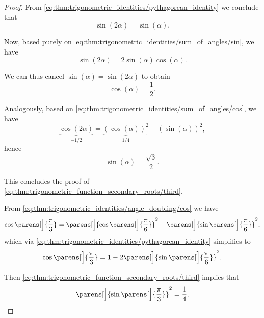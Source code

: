 \begin{proof}
  From \eqref{eq:thm:trigonometric_identities/pythagorean_identity} we conclude that
  \begin{equation}\label{eq:thm:trigonometric_function_secondary_roots/third/proof/cos_double}
    \sin(2\alpha) = \sin(\alpha).
  \end{equation}

  Now, based purely on \eqref{eq:thm:trigonometric_identities/sum_of_angles/sin}, we have
  \begin{equation*}
    \sin(2\alpha) = 2 \sin(\alpha) \cos(\alpha).
  \end{equation*}

  We can thus cancel \( \sin(\alpha) = \sin(2\alpha) \) to obtain
  \begin{equation*}
    \cos(\alpha) = \frac 1 2.
  \end{equation*}

  Analogously, based on \eqref{eq:thm:trigonometric_identities/sum_of_angles/cos}, we have
  \begin{equation*}
    \underbrace{\cos(2\alpha)}_{-1/2} = \underbrace{(\cos(\alpha))^2}_{1/4} - (\sin(\alpha))^2,
  \end{equation*}
  hence
  \begin{equation*}
    \sin(\alpha) = \frac {\sqrt 3} 2.
  \end{equation*}

  This concludes the proof of \eqref{eq:thm:trigonometric_function_secondary_roots/third}.

   From \eqref{eq:thm:trigonometric_identities/angle_doubling/cos} we have
  \begin{equation*}
    \cos\parens[\Big]{ \frac \pi 3 } = \parens[\Big]{ \cos\parens[\Big]{ \frac \pi 6 } }^2 - \parens[\Big]{ \sin\parens[\Big]{ \frac \pi 6 } }^2,
  \end{equation*}
  which via \eqref{eq:thm:trigonometric_identities/pythagorean_identity} simplifies to
  \begin{equation*}
    \cos\parens[\Big]{ \frac \pi 3 } = 1 - 2 \parens[\Big]{ \sin\parens[\Big]{ \frac \pi 6 } }^2.
  \end{equation*}

  Then \eqref{eq:thm:trigonometric_function_secondary_roots/third} implies that
  \begin{equation*}
    \parens[\Big]{ \sin\parens[\Big]{ \frac \pi 3 } }^2 = \frac 1 4.
  \end{equation*}


\end{proof}
